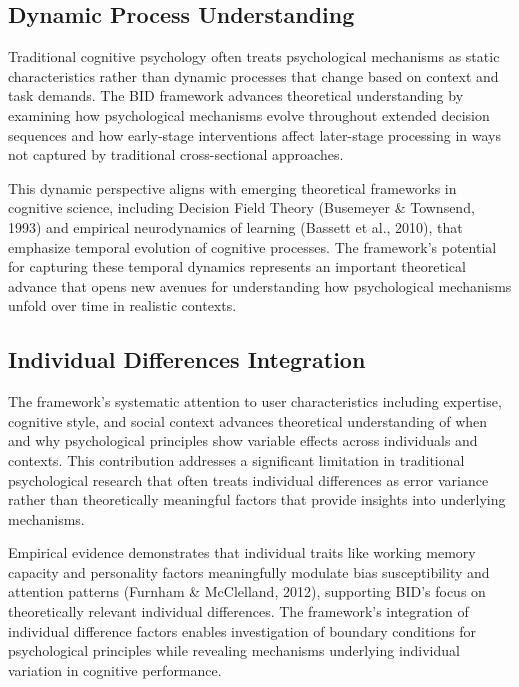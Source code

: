 \documentclass[
  authoryear,
  preprint]{elsarticle}
\begin{document}
\subsection{Dynamic Process
Understanding}\label{dynamic-process-understanding}

Traditional cognitive psychology often treats psychological mechanisms
as static characteristics rather than dynamic processes that change
based on context and task demands. The BID framework advances
theoretical understanding by examining how psychological mechanisms
evolve throughout extended decision sequences and how early-stage
interventions affect later-stage processing in ways not captured by
traditional cross-sectional approaches.

This dynamic perspective aligns with emerging theoretical frameworks in
cognitive science, including Decision Field Theory (Busemeyer \&
Townsend, 1993) and empirical neurodynamics of learning (Bassett et al.,
2010), that emphasize temporal evolution of cognitive processes. The
framework's potential for capturing these temporal dynamics represents
an important theoretical advance that opens new avenues for
understanding how psychological mechanisms unfold over time in realistic
contexts.

\subsection{Individual Differences
Integration}\label{individual-differences-integration}

The framework's systematic attention to user characteristics including
expertise, cognitive style, and social context advances theoretical
understanding of when and why psychological principles show variable
effects across individuals and contexts. This contribution addresses a
significant limitation in traditional psychological research that often
treats individual differences as error variance rather than
theoretically meaningful factors that provide insights into underlying
mechanisms.

Empirical evidence demonstrates that individual traits like working
memory capacity and personality factors meaningfully modulate bias
susceptibility and attention patterns (Furnham \& McClelland, 2012),
supporting BID's focus on theoretically relevant individual differences.
The framework's integration of individual difference factors enables
investigation of boundary conditions for psychological principles while
revealing mechanisms underlying individual variation in cognitive
performance.
\end{document}

